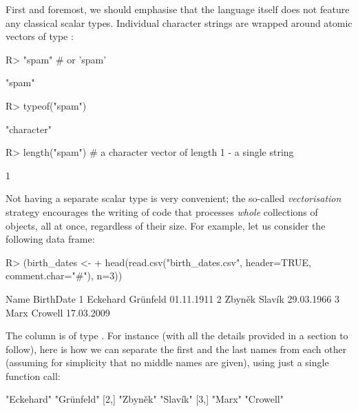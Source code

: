 \documentclass[nojss]{jss}\usepackage[]{graphicx}\usepackage[]{color}
\begin{document}
First and foremost, we should emphasise that the   language
itself does not feature any classical scalar types.
Individual character strings are  wrapped around atomic vectors
of type :

\begin{Schunk}
\begin{Sinput}
R> "spam"          # or 'spam'
\end{Sinput}
\begin{Soutput}
[1] "spam"
\end{Soutput}
\begin{Sinput}
R> typeof("spam")
\end{Sinput}
\begin{Soutput}
[1] "character"
\end{Soutput}
\begin{Sinput}
R> length("spam")  # a character vector of length 1 - a single string
\end{Sinput}
\begin{Soutput}
[1] 1
\end{Soutput}
\end{Schunk}

\noindent
Not having a separate scalar type is very convenient; the so-called
\emph{vectorisation} strategy encourages the writing of code that processes
\textit{whole} collections of objects, all at once, regardless of their size.
For example, let us consider the following data frame:


\begin{Schunk}
\begin{Sinput}
R> (birth_dates <-
+    head(read.csv("birth_dates.csv", header=TRUE, comment.char="#"), n=3))
\end{Sinput}
\begin{Soutput}
               Name  BirthDate
1 Eckehard Grünfeld 01.11.1911
2     Zbyněk Slavík 29.03.1966
3      Marx Crowell 17.03.2009
\end{Soutput}
\end{Schunk}

\noindent
The  column is of type .
For instance (with all the details provided in a section to follow),
here is how we can separate the first and the last names from
each other (assuming for simplicity that no middle names are given),
using just a single function call:

\begin{Schunk}
\begin{Soutput}
     [,1]       [,2]
[1,] "Eckehard" "Grünfeld"
[2,] "Zbyněk"   "Slavík"
[3,] "Marx"     "Crowell"
\end{Soutput}
\end{Schunk}
\end{document}
